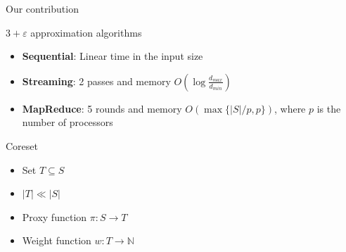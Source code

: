 \documentclass{beamer}
\renewcommand{\epsilon}{\varepsilon}
\begin{document}
\begin{frame}{Our contribution}

  \begin{center}
    \Large
    $3+\epsilon$ approximation algorithms
  \end{center}

  \begin{itemize}
    \vfill
    \item \textbf{Sequential}: Linear time in the input size
    \vfill
    \item \textbf{Streaming}: 2 passes and memory $O\left(\log \frac{d_{max}}{d_{min}}\right)$
    \vfill
    \item \textbf{MapReduce}: 5 rounds and memory
      $O\left( \max\{|S|/p, p\} \right)$, where $p$ is the number of processors
    \vfill
  \end{itemize}

\end{frame}

\begin{frame}{Coreset}
	\begin{itemize}
		\item Set $T \subseteq S$
    \item $|T| \ll |S|$
		\item Proxy function $\pi: S \to T$
		\item Weight function $w: T \to \mathbb{N}$
	\end{itemize}
\end{frame}
\end{document}
